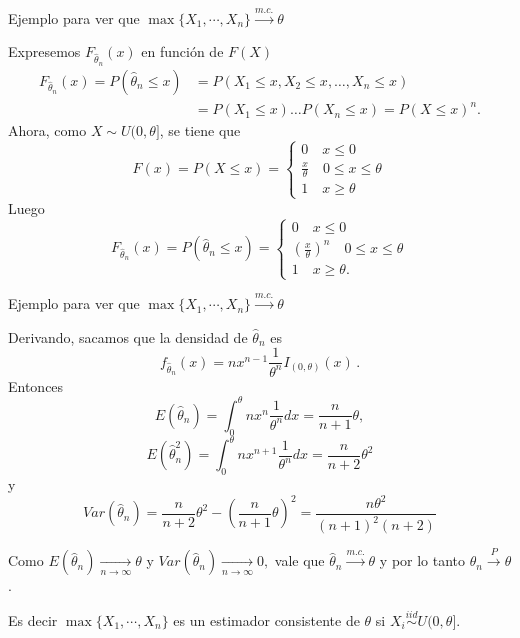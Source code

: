 \documentclass{beamer}
\theoremstyle{definition}
\newcommand{\cmc}{\overset{m.c.}{\rightarrow}}
\newcommand{\ton}{\underset{n\to\infty}{\longrightarrow}}
\newcommand{\cp}{\overset{P}{\rightarrow}}
\begin{document}
\begin{frame}{\color{rosee}Ejemplo para ver que $\max\{X_1,\cdots, X_n\}\stackrel{m.c.}{\rightarrow} \theta$}\small
  
    Expresemos $F_{\widehat{\theta}_n}(x)$ en función de $F(X)$
    \begin{align*}
     F_{\widehat{\theta}_n}(x)= P\left(\widehat{\theta}_n \leq x \right)
      &=P(X_{1} \leq x, X_{2}\leq x, \dots, X_n\leq x)\\
      &= P(X_{1}\leq x)\dots P(X_n\leq x)= P(X\leq x)^n.
    \end{align*}
    Ahora, como $X\sim U(0,\theta]$, se tiene que
    \[F(x)=P(X\leq x) = \begin{cases}
      0 \quad x \leq 0\\
      \frac{x}{\theta} \quad 0\leq x \leq \theta\\
      1 \quad x \geq \theta
    \end{cases}\]
    Luego
    \[F_{\widehat{\theta}_n}(x)=P\left(\widehat{\theta}_n \leq x \right) = \begin{cases}
      0 \quad x \leq 0\\
      \left( \frac{x}{\theta}\right)^n \quad 0\leq x \leq \theta\\
      1 \quad x \geq \theta.
    \end{cases}\]
  
\end{frame}


\begin{frame}{\color{rosee}Ejemplo para ver que $\max\{X_1,\cdots, X_n\}\stackrel{m.c.}{\rightarrow} \theta$}\small
  
    Derivando, sacamos que la densidad de $\widehat{\theta}_n$ es
    \[f_{\widehat{\theta}_n}(x)=n x^{n-1} \frac{1}{\theta^n}
    I_{(0,\theta)}(x)\,.\] 
    Entonces
    \[E(\widehat{\theta}_n)=\int_{0}^{\theta} n x^n
    \frac{1}{\theta^n} dx =\frac{n}{n+1} \theta,\]
    \[E(\widehat{\theta}_n^{2})=\int_{0}^{\theta} n x^{n+1}
    \frac{1}{\theta^n} dx =\frac{n}{n+2} \theta^{2}\] y
    \[Var(\widehat{\theta}_n)= \frac{n}{n+2} \theta^{2} -
    \left(\frac{n}{n+1} \theta\right)^{2}=\dfrac{n\theta^2}{(n+1)^2(n+2)}\]
  
  Como $E(\widehat{\theta}_n) \ton \theta$ y $Var(\widehat{\theta}_n) \ton 0,$ vale que $\widehat{\theta}_n \cmc \theta$ y por lo tanto $\widehat{\theta}_n \cp \theta$.
  
  
 Es decir $\max\{X_1, \cdots, X_n\}$ es un estimador consistente de $\theta$ si $X_i\stackrel{iid}{\sim} U(0,\theta]$.
\end{frame}
\end{document}
